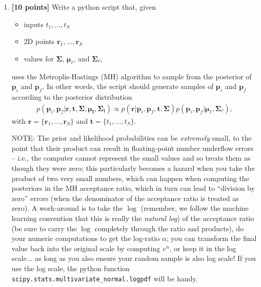 \documentclass[10pt]{article}
\begin{document}
\begin{enumerate}

\item {\bf [10 points]} Write a python script that, given
\begin{itemize}
\item inputs $t_1, ..., t_S$
\item 2D points $\mathbf{r}_1, ..., \mathbf{r}_S$
\item values for $\boldsymbol{\Sigma}$, $\boldsymbol{\mu}_{\boldsymbol{\ell}}$, and $\boldsymbol{\Sigma}_{\boldsymbol{\ell}}$,
\end{itemize}
uses the Metroplis-Hastings (MH) algorithm to sample from the posterior of $\mathbf{p}_i$ and $\mathbf{p}_f$.  In other words, the script should generate samples of $\mathbf{p}_i$ and $\mathbf{p}_f$ according to the posterior distribution
\begin{eqnarray*}
p(\mathbf{p}_i, \mathbf{p}_f | \mathbf{r}, \mathbf{t}, \boldsymbol{\Sigma}, \boldsymbol{\mu}_\mathbf{l}, \boldsymbol{\Sigma}_\mathbf{l}) 
\propto 
p(\mathbf{r} | \mathbf{p}_i, \mathbf{p}_f, \mathbf{t}, \boldsymbol{\Sigma})
p(\mathbf{p}_i, \mathbf{p}_f | \boldsymbol{\mu}_\mathbf{\ell}, \boldsymbol{\Sigma}_\mathbf{\ell}),
\end{eqnarray*}
with $\mathbf{r} = \{\mathbf{r}_1, ..., \mathbf{r}_S \}$ and $\mathbf{t} = \{t_1, ..., t_S \}$.

NOTE: The prior and likelihood probabilities can be {\em extremely} small, to the point that their product can result in floating-point number underflow errors -- i.e., the computer cannot represent the small values and so treats them as though they were zero; this particularly becomes a hazard when you take the product of two very small numbers, which can happen when computing the posteriors in the MH acceptance ratio, which in turn can lead to ``division by zero'' errors (when the denominator of the acceptance ratio is treated as zero).  A work-around is to take the $\log$ (remember, we follow the machine learning convention that this is really the {\em natural log}) of the acceptance ratio (be sure to carry the $\log$ completely through the ratio and products), do your numeric computations to get the log-ratio $\alpha$; you can transform the final value back into the original scale by computing $e^{\alpha}$, or keep it in the log scale... as long as you also ensure your random sample is also log scale!  If you use the log scale, the python function {\tt scipy.stats.multivariate\_normal.logpdf} will be handy.


\end{enumerate}
\end{document}
